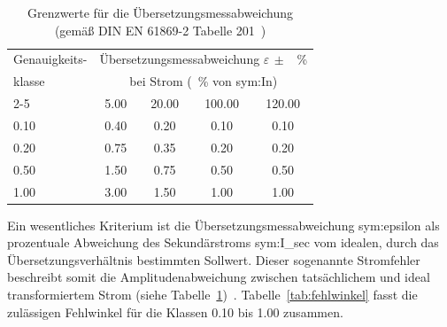 \begin{table}[H]
    \centering
    \caption[Grenzwerte für die Übersetzungsmessabweichung]{Grenzwerte für die Übersetzungsmessabweichung (gemäß DIN EN 61869-2 Tabelle 201~\cite[S.~22]{norm-DIN_EN_61869_2-Messwandler_Teil2-DIN})}
    \label{tab:stromfehler}
    \begin{tabular}{lcccc}
        \toprule
        Genauigkeits- & \multicolumn{4}{c}{Übersetzungsmessabweichung $\varepsilon\,\pm$ \SI{}{\percent}}                                             \\
        klasse        & \multicolumn{4}{c}{bei Strom (\SI{}{\percent} von \gls{sym:In})}                                                              \\
        \cmidrule(lr){2-5}
                      & \num{5,00}                                                                        & \num{20,00} & \num{100,00} & \num{120,00} \\
        \midrule
        \num{0,10}    & \num{0,40}                                                                        & \num{0,20}  & \num{0,10}   & \num{0,10}   \\
        \num{0,20}    & \num{0,75}                                                                        & \num{0,35}  & \num{0,20}   & \num{0,20}   \\
        \num{0,50}    & \num{1,50}                                                                        & \num{0,75}  & \num{0,50}   & \num{0,50}   \\
        \num{1,00}    & \num{3,00}                                                                        & \num{1,50}  & \num{1,00}   & \num{1,00}   \\
        \bottomrule
    \end{tabular}
\end{table}

Ein wesentliches Kriterium ist die Übersetzungsmessabweichung \gls{sym:epsilon} als prozentuale Abweichung des Sekundärstroms \gls{sym:I_sec} vom idealen, durch das Übersetzungsverhältnis bestimmten Sollwert. Dieser sogenannte Stromfehler beschreibt somit die Amplitudenabweichung zwischen tatsächlichem und ideal transformiertem Strom (siehe Tabelle~\ref{tab:stromfehler})~\cite[S.~21]{norm-DIN_EN_61869_2-Messwandler_Teil2-DIN}. Tabelle~\ref{tab:fehlwinkel} fasst die zulässigen Fehlwinkel für die Klassen \num{0,10} bis \num{1,00} zusammen.

